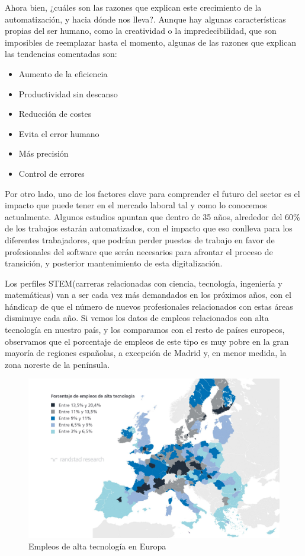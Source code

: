 \documentclass[12pt,spanish,chapterprefix, numbers=noenddot]{book}
\numberwithin{equation}{section}
\numberwithin{figure}{section}
\begin{document}
Ahora bien, ¿cuáles son las razones que explican este crecimiento de la automatización, y hacia dónde nos lleva?. Aunque hay algunas características propias del ser humano, como la creatividad o la impredecibilidad, que son imposibles de reemplazar hasta el momento, algunas de las razones que explican las tendencias comentadas son:
\begin{itemize}
\item Aumento de la eficiencia 
\item Productividad sin descanso
\item Reducción de costes
\item Evita el error humano
\item Más precisión
\item Control de errores
\end{itemize}
Por otro lado, uno de los factores clave para comprender el futuro del sector es el impacto que puede tener en el mercado laboral tal y como lo conocemos actualmente. Algunos estudios apuntan que dentro de 35 años, alrededor del 60\% de los trabajos estarán automatizados, con el impacto que eso conlleva para los diferentes trabajadores, que podrían perder puestos de trabajo en favor de profesionales del software que serán necesarios para afrontar el proceso de transición, y posterior mantenimiento de esta digitalización. 

Los perfiles STEM(carreras relacionadas con ciencia, tecnología, ingeniería y matemáticas) van a ser cada vez más demandados en los próximos años, con el hándicap de que el número de nuevos profesionales relacionados con estas áreas disminuye cada año. 
Si vemos los datos de empleos relacionados con alta tecnología en nuestro país, y los comparamos con el resto de países europeos, observamos que el porcentaje de empleos de este tipo es muy pobre en la gran mayoría de regiones españolas, a excepción de Madrid y, en menor medida, la zona noreste de la península. 

\begin{figure}[hbt!]
\centering
\includegraphics[width=12cm]{Figs/empleosTecEur.jpg}
\par
\caption{\label{fig:empleoEur}Empleos de alta tecnología en Europa}
\end{figure}
\end{document}
